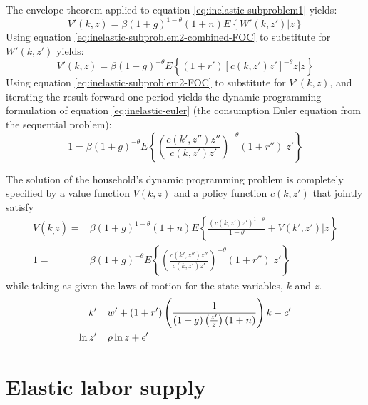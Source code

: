 \documentclass[11pt]{article}
\begin{document}
The envelope theorem applied to equation \ref{eq:inelastic-subproblem1} yields:
	\begin{equation}
		V'(k, z) = \beta (1 + g)^{1-\theta}(1 + n) E\left\{W'(k, z') | z\right\}
	\end{equation}
Using equation \ref{eq:inelastic-subproblem2-combined-FOC} to substitute for $W'(k, z')$ yields:
	\begin{equation}
		V'(k, z) = \beta (1 + g)^{-\theta} E\left\{(1 + r')[c(k, z') z']^{-\theta}z | z\right\}
	\end{equation}
Using equation \ref{eq:inelastic-subproblem2-FOC} to substitute for $V'(k, z)$, and iterating the result forward one period yields the dynamic programming formulation of equation \ref{eq:inelastic-euler} (the consumption Euler equation from the sequential problem):
	\begin{equation}
		1 = \beta (1 + g)^{-\theta} E\left\{\left(\frac{c(k', z'') z''}{c(k, z') z'}\right)^{-\theta} (1 + r'') \bigg| z'\right\}
	\end{equation}
	
The solution of the household's dynamic programming problem is completely specified by a value function $V(k, z)$ and a policy function $c(k, z')$ that jointly satisfy
	\begin{align}
		V(k_, z) =& \beta(1+g)^{1-\theta}(1+n) E\left\{\frac{\left(c(k, z')z'\right)^{1-\theta}}{1-\theta} + V(k', z') \bigg| z\right\} \\
		1 =& \beta (1 + g)^{-\theta} E\left\{\left(\frac{c(k', z'') z''}{c(k, z') z'}\right)^{-\theta} (1 + r'') \bigg| z'\right\}
	\end{align}
while taking as given the laws of motion for the state variables, $k$ and $z$.
	\begin{align}
		k' =& w' + (1 + r')\left(\frac{1}{(1 + g)\left(\frac{z'}{z}\right)(1 + n)}\right)k - c'\notag \\
		\ln z' =& \rho \ln z + \epsilon' \notag
	\end{align}
	
\section{Elastic labor supply}
\end{document}
